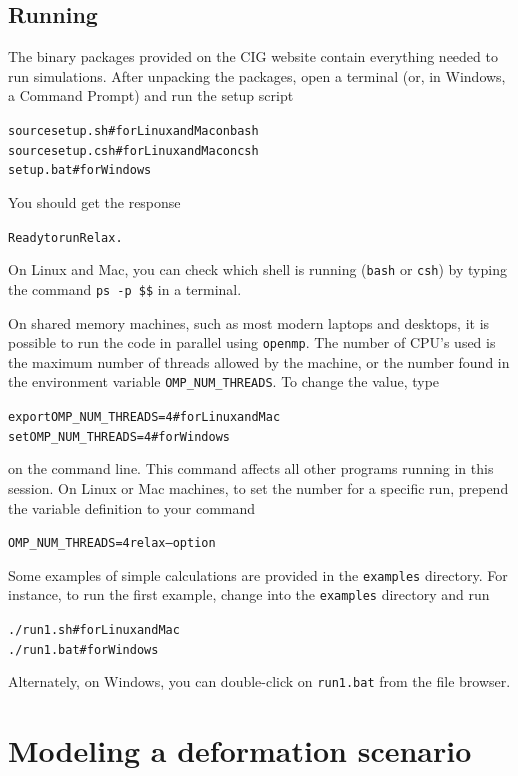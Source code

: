 \documentclass[10pt]{article}
\begin{document}
\subsection{Running}


The binary packages provided on the CIG website contain everything needed to run simulations.  After unpacking the packages, open a terminal (or, in Windows, a Command Prompt) and run the setup script
\begin{alltt}
{\color{orange}source setup.sh}  # for Linux and Mac on bash
{\color{orange}source setup.csh} # for Linux and Mac on csh
{\color{orange}setup.bat}        # for Windows
\end{alltt}
You should get the response
\begin{alltt}
{\color{NavyBlue}Ready to run Relax.}
\end{alltt}
On Linux and Mac, you can check which shell is running (\verb`bash` or \verb`csh`) by typing the command \verb`ps -p $$` in a terminal.

On shared memory machines, such as most modern laptops and desktops, it is possible to run the code in parallel using \verb'openmp'. The number of CPU's used is the maximum number of threads allowed by the machine, or the number found in the environment variable \verb'OMP_NUM_THREADS'. To change the value, type
\begin{alltt}
{\color{orange}export OMP_NUM_THREADS=4} # for Linux and Mac
{\color{orange}set OMP_NUM_THREADS=4}    # for Windows
\end{alltt}
on the command line. This command affects all other programs running
in this session. On Linux or Mac machines, to set the number for a
specific run, prepend the variable definition to your command
\begin{alltt}
{\color{orange}OMP_NUM_THREADS=4 relax --option}
\end{alltt}

Some examples of simple calculations are provided in the \verb'examples' directory. For instance, to run the first example, change into the \verb'examples' directory and run
\begin{alltt}
{\color{orange}./run1.sh}  # for Linux and Mac
{\color{orange}./run1.bat} # for Windows
\end{alltt}
Alternately, on Windows, you can double-click on \verb'run1.bat' from the file browser.

\section{Modeling a deformation scenario}
\end{document}
